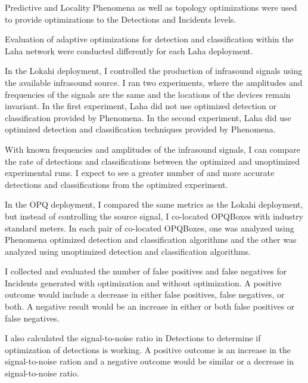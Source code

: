 Predictive and Locality Phenomena as well as topology optimizations were used to provide optimizations to the Detections and Incidents levels.

Evaluation of adaptive optimizations for detection and classification within the Laha network were conducted differently for each Laha deployment.

In the Lokahi deployment, I controlled the production of infrasound signals using the available infrasound source. I ran two experiments, where the amplitudes and frequencies of the signals are the same and the locations of the devices remain invariant. In the first experiment, Laha did not use optimized detection or classification provided by Phenomena. In the second experiment, Laha did use optimized detection and classification techniques provided by Phenomena.

With known frequencies and amplitudes of the infrasound signals, I can compare the rate of detections and classifications between the optimized and unoptimized experimental runs. I expect to see a greater number of and more accurate detections and classifications from the optimized experiment.

In the OPQ deployment, I compared the same metrics as the Lokahi deployment, but instead of controlling the source signal, I co-located OPQBoxes with industry standard meters. In each pair of co-located OPQBoxes, one was analyzed using Phenomena optimized detection and classification algorithms and the other was analyzed using unoptimized detection and classification algorithms.

I collected and evaluated the number of false positives and false negatives for Incidents generated with optimization and without optimization. A positive outcome would include a decrease in either false positives, false negatives, or both. A negative result would be an increase in either or both false positives or false negatives.

I also calculated the signal-to-noise ratio in Detections to determine if optimization of detections is working. A positive outcome is an increase in the signal-to-noise ration and a negative outcome would be similar or a decrease in signal-to-noise ratio.

